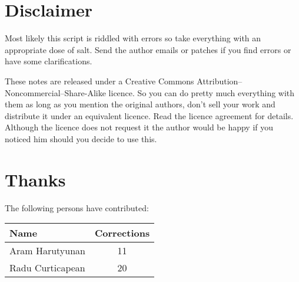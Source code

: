 \section*{Disclaimer}

Most likely this script is riddled with errors so take everything with an appropriate dose of salt. Send the author emails or patches if you find errors or have some clarifications. 

These notes are released under a Creative Commons Attribution--Noncommercial--Share-Alike licence. So you can do pretty much everything with them as long as you mention the original authors, don't sell your work and distribute it under an equivalent licence. Read the licence agreement for details. Although the licence does not request it the author would be happy if you noticed him should you decide to use this.

\section*{Thanks}
The following persons have contributed:

\begin{center}
\begin{tabular}{l|c}
Name & Corrections\\\hline
Aram Harutyunan & 11 \\
Radu Curticapean & 20
\end{tabular}
\end{center}
\newpage